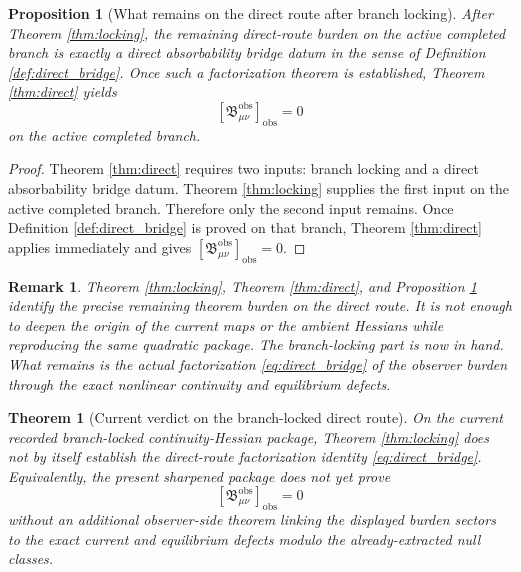 \documentclass[11pt]{article}
\newcommand{\ObsBurden}{\mathfrak B_{\mu\nu}^{\mathrm{obs}}}
\newcommand{\ObserverClass}[1]{\left[#1\right]_{\mathrm{obs}}}
\newtheorem{proposition}{Proposition}
\newtheorem{remark}{Remark}
\newtheorem{theorem}{Theorem}
\begin{document}
\begin{proposition}[What remains on the direct route after branch locking]
\label{prop:direct_burden}
After Theorem \ref{thm:locking}, the remaining direct-route burden on the active completed branch is exactly a direct absorbability bridge datum in the sense of Definition \ref{def:direct_bridge}. Once such a factorization theorem is established, Theorem \ref{thm:direct} yields
\[
\ObserverClass{\ObsBurden}=0
\]
on the active completed branch.
\end{proposition}

\begin{proof}
Theorem \ref{thm:direct} requires two inputs: branch locking and a direct absorbability bridge datum. Theorem \ref{thm:locking} supplies the first input on the active completed branch. Therefore only the second input remains. Once Definition \ref{def:direct_bridge} is proved on that branch, Theorem \ref{thm:direct} applies immediately and gives \(\ObserverClass{\ObsBurden}=0\).
\end{proof}

\begin{remark}
Theorem \ref{thm:locking}, Theorem \ref{thm:direct}, and Proposition \ref{prop:direct_burden} identify the precise remaining theorem burden on the direct route. It is not enough to deepen the origin of the current maps or the ambient Hessians while reproducing the same quadratic package. The branch-locking part is now in hand. What remains is the actual factorization \eqref{eq:direct_bridge} of the observer burden through the exact nonlinear continuity and equilibrium defects.
\end{remark}

\begin{theorem}[Current verdict on the branch-locked direct route]
\label{thm:direct_open}
On the current recorded branch-locked continuity-Hessian package, Theorem \ref{thm:locking} does not by itself establish the direct-route factorization identity \eqref{eq:direct_bridge}. Equivalently, the present sharpened package does not yet prove
\[
\ObserverClass{\ObsBurden}=0
\]
without an additional observer-side theorem linking the displayed burden sectors to the exact current and equilibrium defects modulo the already-extracted null classes.
\end{theorem}
\end{document}
